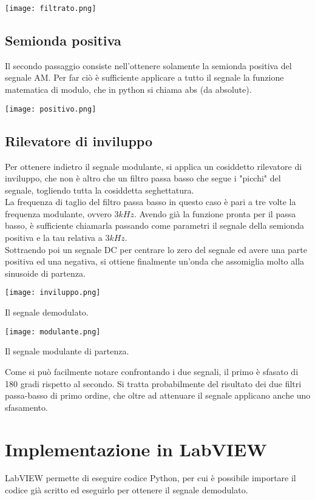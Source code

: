 \documentclass{article}
\begin{document}
\begin{center}
    \texttt{[image: filtrato.png]}
\end{center}

\subsection{Semionda positiva}
Il secondo passaggio consiste nell'ottenere solamente la semionda positiva del segnale AM. Per far ciò è sufficiente
applicare a tutto il segnale la funzione matematica di modulo, che in python si chiama abs (da absolute).

\begin{center}
    \texttt{[image: positivo.png]}
\end{center}

\subsection{Rilevatore di inviluppo}
Per ottenere indietro il segnale modulante, si applica un cosiddetto rilevatore di inviluppo, che non è altro che un filtro
passa basso che segue i "picchi" del segnale, togliendo tutta la cosiddetta seghettatura.
\\
La frequenza di taglio del filtro passa basso in questo caso è pari a tre volte la frequenza modulante, ovvero $3 kHz$.
Avendo già la funzione pronta per il passa basso, è sufficiente chiamarla passando come parametri il segnale della semionda
positiva e la tau relativa a $3 kHz$.
\\
Sottraendo poi un segnale DC per centrare lo zero del segnale ed avere una parte positiva ed una negativa, si ottiene finalmente
un'onda che assomiglia molto alla sinusoide di partenza.

\begin{center}
    \texttt{[image: inviluppo.png]}
\end{center}
Il segnale demodulato.

\begin{center}
    \texttt{[image: modulante.png]}
\end{center}
Il segnale modulante di partenza.

\vspace{2cm}
Come si può facilmente notare confrontando i due segnali, il primo è sfasato di 180 gradi rispetto al secondo.
Si tratta probabilmente del risultato dei due filtri passa-basso di primo ordine, che oltre ad attenuare il segnale
applicano anche uno sfasamento.

\section{Implementazione in LabVIEW}
LabVIEW permette di eseguire codice Python, per cui è possibile importare il codice già scritto ed eseguirlo per ottenere
il segnale demodulato.
\end{document}
